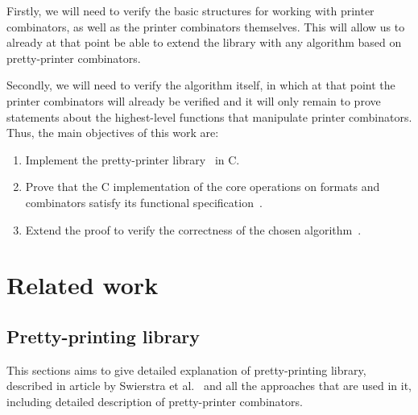 \documentclass[14pt]{constructor-diploma}
\begin{document}
Firstly, we will need to verify the basic structures for working with printer combinators, as well as the printer combinators themselves. 
This will allow us to already at that point be able to extend the library with any algorithm based on pretty-printer combinators.

Secondly, we will need to verify the algorithm itself, in which at that point the printer combinators will already be verified and 
it will only remain to prove statements about the highest-level functions that manipulate printer combinators.
Thus, the main objectives of this work are:

\begin{enumerate}
  \item Implement the pretty-printer library~\cite{swierstra} in C.
  \item Prove that the C implementation of the core operations on formats and combinators satisfy its functional specification~\cite{korolihin}.
  \item Extend the proof to verify the correctness of the chosen algorithm~\cite{swierstra}.
\end{enumerate}


\section{Related work}

\subsection{Pretty-printing library}

This sections aims to give detailed explanation of pretty-printing library, described in article by Swierstra et al.~\cites{swierstra} 
and all the approaches that are used in it, including detailed description of pretty-printer combinators.
\end{document}

